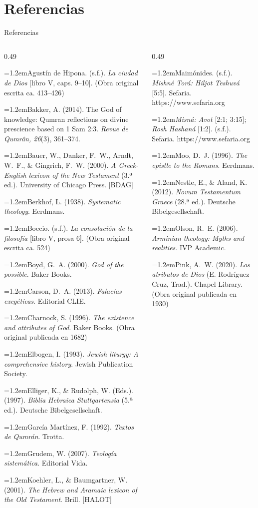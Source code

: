 \documentclass[hyperref={bookmarks=false},aspectratio=169]{beamer}
\newcommand{\refapa}[1]{\par{\RaggedRight\hangindent=1.2em\hangafter=1\noindent #1\par}\vspace{3pt}}
\begin{document}
\section{Referencias}

\begin{frame}{Referencias}
\fontsize{5.1}{6.1}\selectfont
\begin{columns}[t,onlytextwidth]
\begin{column}{0.49\textwidth}
\refapa{Agustín de Hipona. (s.f.). \emph{La ciudad de Dios} [libro V, caps. 9--10]. (Obra original escrita ca. 413--426)}
\refapa{Bakker, A. (2014). The God of knowledge: Qumran reflections on divine prescience based on 1 Sam 2:3. \emph{Revue de Qumrân, 26}(3), 361--374.}
\refapa{Bauer, W., Danker, F.~W., Arndt, W.~F., \& Gingrich, F.~W. (2000). \emph{A Greek-English lexicon of the New Testament} (3.ª ed.). University of Chicago Press. [BDAG]}
\refapa{Berkhof, L. (1938). \emph{Systematic theology}. Eerdmans.}
\refapa{Boecio. (s.f.). \emph{La consolación de la filosofía} [libro V, prosa 6]. (Obra original escrita ca. 524)}
\refapa{Boyd, G.~A. (2000). \emph{God of the possible}. Baker Books.}
\refapa{Carson, D.~A. (2013). \emph{Falacias exegéticas}. Editorial CLIE.}
\refapa{Charnock, S. (1996). \emph{The existence and attributes of God}. Baker Books. (Obra original publicada en 1682)}
\refapa{Elbogen, I. (1993). \emph{Jewish liturgy: A comprehensive history}. Jewish Publication Society.}
\refapa{Elliger, K., \& Rudolph, W. (Eds.). (1997). \emph{Biblia Hebraica Stuttgartensia} (5.ª ed.). Deutsche Bibelgesellschaft.}
\refapa{García Martínez, F. (1992). \emph{Textos de Qumrán}. Trotta.}
\refapa{Grudem, W. (2007). \emph{Teología sistemática}. Editorial Vida.}
\refapa{Koehler, L., \& Baumgartner, W. (2001). \emph{The Hebrew and Aramaic lexicon of the Old Testament}. Brill. [HALOT]}
\end{column}
\begin{column}{0.49\textwidth}
\refapa{Maimónides. (s.f.). \emph{Mishné Torá: Hiljot Teshuvá} [5:5]. Sefaria. https://www.sefaria.org}
\refapa{\emph{Misná: Avot} [2:1; 3:15]; \emph{Rosh Hashaná} [1:2]. (s.f.). Sefaria. https://www.sefaria.org}
\refapa{Moo, D.~J. (1996). \emph{The epistle to the Romans}. Eerdmans.}
\refapa{Nestle, E., \& Aland, K. (2012). \emph{Novum Testamentum Graece} (28.ª ed.). Deutsche Bibelgesellschaft.}
\refapa{Olson, R.~E. (2006). \emph{Arminian theology: Myths and realities}. IVP Academic.}
\refapa{Pink, A.~W. (2020). \emph{Los atributos de Dios} (E. Rodríguez Cruz, Trad.). Chapel Library. (Obra original publicada en 1930)}

\end{column}
\end{columns}
\end{frame}
\end{document}
